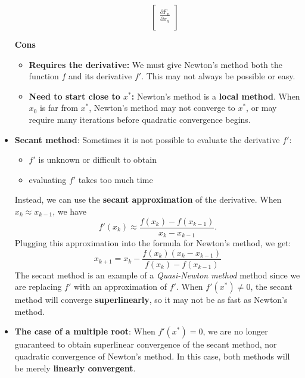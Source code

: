 \documentclass{report}
\begin{document}
\begin{itemize}
\begin{itemize}
$$\begin{bmatrix}
            \frac{\partial F_n}{\partial x_n}\\
        \end{bmatrix}$$
    \end{itemize}
    \bigbreak \noindent 
    \textbf{Cons}
    \begin{itemize}
        \item \textbf{Requires the derivative:} We must give Newton's method both the function $f$ and its derivative $f'$. This may not always be possible or easy.
        \item \textbf{Need to start close to $x^*$:} Newton's method is a \textbf{local method}. When $x_0$ is far from $x^*$, Newton's method may not converge to $x^*$, or may require many iterations before quadratic convergence begins.
    \end{itemize}
\item \textbf{Secant method}:
    Sometimes it is not possible to evaluate the derivative $f'$:
    \begin{itemize}
        \item $f'$ is unknown or difficult to obtain
        \item evaluating $f'$ takes too much time
    \end{itemize}
    Instead, we can use the \textbf{secant approximation} of the derivative. When $x_k \approx x_{k-1}$, we have
    $$ f'(x_k) \approx \frac{f(x_k) - f(x_{k-1})}{x_k - x_{k-1}}.$$
    Plugging this approximation into the formula for Newton's method, we get:
    $$x_{k+1} = x_k - \frac{f(x_k)(x_k - x_{k-1})}{f(x_k) - f(x_{k-1})}$$
    \bigbreak \noindent 
    The secant method is an example of a \textit{Quasi-Newton method} method since we are replacing $f'$ with an approximation of $f'$.
    \bigbreak \noindent 
    When $f'(x^*) \neq 0$, the secant method will converge \textbf{superlinearly}, so it may not be as fast as Newton's method.
\item \textbf{The case of a multiple root}:
    When $f'(x^*) = 0$, we are no longer guaranteed to obtain superlinear convergence of the secant method, nor quadratic convergence of Newton's method. In this case, both methods will be merely \textbf{linearly convergent}.


\end{itemize}
\end{document}

